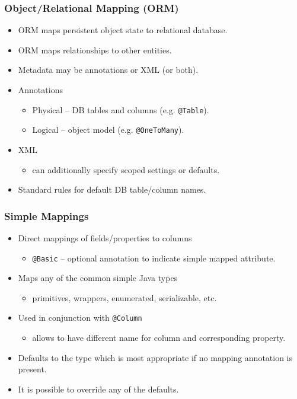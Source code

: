 \documentclass[10pt,xcolor=pdflatex]{beamer}
\begin{document}
\begin{frame}\frametitle{Object/Relational Mapping (ORM)}
	\begin{itemize}
		\item ORM maps persistent object state to relational database.
		\item ORM maps relationships to other entities.
		\item Metadata may be annotations or XML (or both).
		\item Annotations
          \begin{itemize}
            \item Physical -- DB tables and columns (e.g. \texttt{@Table}).
        	\item Logical -- object model (e.g. \texttt{@OneToMany}).
          \end{itemize}
		\item XML
          \begin{itemize}
        	\item can additionally specify scoped settings or defaults.
          \end{itemize}
		\item Standard rules for default DB table/column names.
	\end{itemize}
\end{frame}


\begin{frame}\frametitle{Simple Mappings}
	\begin{itemize}
		\item Direct mappings of fields/properties to columns
          \begin{itemize}
        	\item \texttt{@Basic} -- optional annotation to indicate simple mapped attribute.
          \end{itemize}
        \item Maps any of the common simple Java types
          \begin{itemize}
        	\item primitives, wrappers, enumerated, serializable, etc.
          \end{itemize}
		\item Used in conjunction with \texttt{@Column}
          \begin{itemize}
            \item allows to have different name for column and corresponding property.
          \end{itemize}
        \item Defaults to the type which is most appropriate if no mapping annotation is present.
		\item It is possible to override any of the defaults.
	\end{itemize}
\end{frame}
\end{document}
